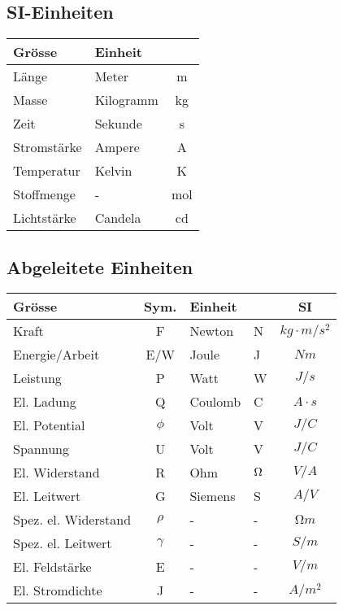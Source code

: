 \begin{sectionbox}
\begin{emphbox}
\begin{tabular}{ccll}
			\end{tabular}
		\end{emphbox}
	
	\subsection{SI-Einheiten}
		\begin{emphbox}
			\begin{tabular}{llc}
				Grösse & Einheit & \\
				\hline
				Länge & Meter & m \\
				Masse & Kilogramm & kg \\
				Zeit & Sekunde & s \\
				Stromstärke & Ampere & A \\
				Temperatur & Kelvin & K \\
				Stoffmenge & - & mol \\
				Lichtstärke & Candela & cd			
		\end{tabular}
	\end{emphbox}
	
	
	\subsection{Abgeleitete Einheiten}
		\begin{emphbox}
			\begin{tabular}{lcllc}
				Grösse & Sym. & Einheit &  & SI \\
				\hline
				Kraft & F & Newton & N & $kg\cdot m/s^2$ \\
				Energie/Arbeit & E/W & Joule & J & $Nm$ \\
				Leistung & P & Watt & W & $J/s$ \\
				El. Ladung & Q & Coulomb & C & $A \cdot s$ \\
				El. Potential & $\phi$ & Volt & V & $J/C$ \\
				Spannung & U & Volt & V & $J/C$ \\
				El. Widerstand & R & Ohm & $\ohm$ & $V/A$ \\
				El. Leitwert & G & Siemens & S & $A/V$ \\
				Spez. el. Widerstand & $\rho$ & - & - & $Ωm$ \\
				Spez. el. Leitwert & $\gamma$ & - & - & $S/m$ \\
				El. Feldstärke & E & - & - & $V/m$ \\
				El. Stromdichte & J & - & - & $A/m^2$ \\
			\end{tabular}
		\end{emphbox}
	
\end{sectionbox}
